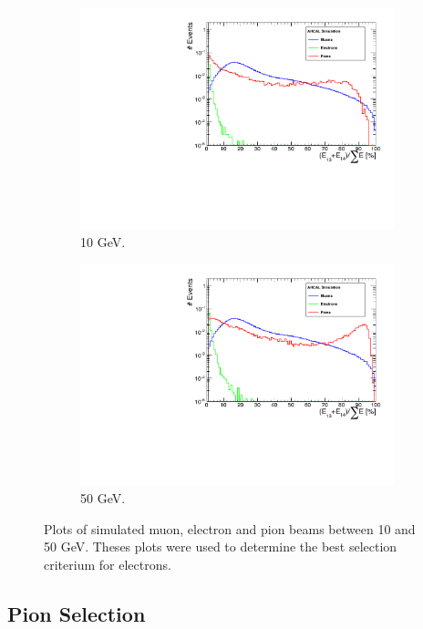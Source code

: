 \begin{figure}[htbp!]
\begin{subfigure}[t]{0.5\textwidth}
		\includegraphics[width=1\linewidth]{chap5/fig_AHCAL_timing/Electrons/SelectionCut_EnergyLastLayers_10GeV}
		\caption{10 GeV.} \label{fig:e10GeV_Elast}
	\end{subfigure}
	\hfill
	\begin{subfigure}[t]{0.5\textwidth}
		\centering
		\includegraphics[width=1\linewidth]{chap5/fig_AHCAL_timing/Electrons/SelectionCut_EnergyLastLayers_50GeV}
		\caption{50 GeV.} \label{fig:e50GeV_Elast}
	\end{subfigure}
	\caption{Plots of simulated muon, electron and pion beams between 10 and 50 GeV. Theses plots were used to determine the best selection criterium for electrons.} \label{fig:electronselection}
\end{figure}

\subsection{Pion Selection}

